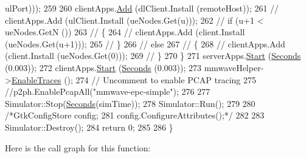 \begin{DoxyCode}
{       ulPort)));}
259 
260                 clientApps.\hyperlink{classns3_1_1ApplicationContainer_ad09ab1a1ad5849d518d5f4c262e38152}{Add} (dlClient.Install (remoteHost));
261 \textcolor{comment}{//              clientApps.Add (ulClient.Install (ueNodes.Get(u)));}
262 \textcolor{comment}{//              if (u+1 < ueNodes.GetN ())}
263 \textcolor{comment}{//              \{}
264 \textcolor{comment}{//                      clientApps.Add (client.Install (ueNodes.Get(u+1)));}
265 \textcolor{comment}{//              \}}
266 \textcolor{comment}{//              else}
267 \textcolor{comment}{//              \{}
268 \textcolor{comment}{//                      clientApps.Add (client.Install (ueNodes.Get(0)));}
269 \textcolor{comment}{//              \}}
270         \}
271         serverApps.\hyperlink{classns3_1_1ApplicationContainer_a8eff87926507020bbe3e1390358a54a7}{Start} (\hyperlink{group__timecivil_ga33c34b816f8ff6628e33d5c8e9713b9e}{Seconds} (0.003));
272         clientApps.\hyperlink{classns3_1_1ApplicationContainer_a8eff87926507020bbe3e1390358a54a7}{Start} (\hyperlink{group__timecivil_ga33c34b816f8ff6628e33d5c8e9713b9e}{Seconds} (0.003));
273         mmwaveHelper->\hyperlink{classns3_1_1MmWaveHelper_a4eae3871876b62965d612d9a56ed21bc}{EnableTraces} ();
274         \textcolor{comment}{// Uncomment to enable PCAP tracing}
275         \textcolor{comment}{//p2ph.EnablePcapAll("mmwave-epc-simple");}
276 
277         Simulator::Stop(\hyperlink{group__timecivil_ga33c34b816f8ff6628e33d5c8e9713b9e}{Seconds}(simTime));
278         Simulator::Run();
279 
280         \textcolor{comment}{/*GtkConfigStore config;}
281 \textcolor{comment}{  config.ConfigureAttributes();*/}
282 
283         Simulator::Destroy();
284         \textcolor{keywordflow}{return} 0;
285 
286 \}
\end{DoxyCode}


Here is the call graph for this function\+:


